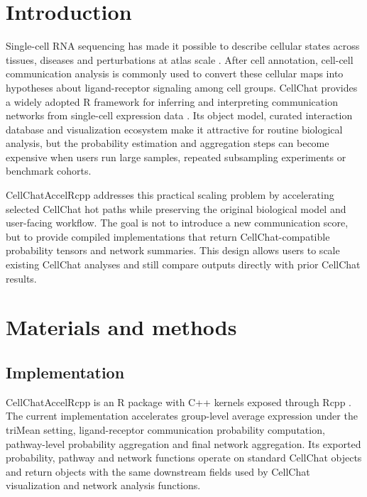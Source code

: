 \documentclass[unnumsec,webpdf,contemporary,large]{oup-authoring-template}
\begin{document}

\maketitle

\section{Introduction}

Single-cell RNA sequencing has made it possible to describe cellular states across tissues, diseases and perturbations at atlas scale \citep{regev2017human,hao2021integrated}.
After cell annotation, cell-cell communication analysis is commonly used to convert these cellular maps into hypotheses about ligand-receptor signaling among cell groups.
CellChat provides a widely adopted R framework for inferring and interpreting communication networks from single-cell expression data \citep{armingol2021deciphering,dimitrov2022comparison,jin2021cellchat}.
Its object model, curated interaction database and visualization ecosystem make it attractive for routine biological analysis, but the probability estimation and aggregation steps can become expensive when users run large samples, repeated subsampling experiments or benchmark cohorts.

CellChatAccelRcpp addresses this practical scaling problem by accelerating selected CellChat hot paths while preserving the original biological model and user-facing workflow.
The goal is not to introduce a new communication score, but to provide compiled implementations that return CellChat-compatible probability tensors and network summaries.
This design allows users to scale existing CellChat analyses and still compare outputs directly with prior CellChat results.

\section{Materials and methods}

\subsection{Implementation}

CellChatAccelRcpp is an R package with C++ kernels exposed through Rcpp \citep{eddelbuettel2011rcpp}.
The current implementation accelerates group-level average expression under the triMean setting, ligand-receptor communication probability computation, pathway-level probability aggregation and final network aggregation.
Its exported probability, pathway and network functions operate on standard CellChat objects and return objects with the same downstream fields used by CellChat visualization and network analysis functions.
\end{document}

